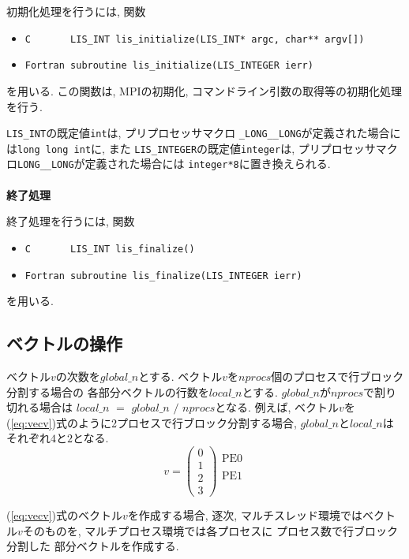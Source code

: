 \documentclass[a4paper]{jarticle}
\begin{document}
{{初期化処理を行うには, 関数
\begin{itemize}
\item \verb+C       LIS_INT lis_initialize(LIS_INT* argc, char** argv[])+
\item \verb+Fortran subroutine lis_initialize(LIS_INTEGER ierr)+
\end{itemize}
を用いる. 
この関数は, MPIの初期化, コマンドライン引数の取得等の初期化処理を行う. 

{\tt LIS\_INT}の既定値{\tt int}は, プリプロセッサマクロ
{\tt \_LONG\_\_LONG}が定義された場合には{\tt long long int}に, また
{\tt LIS\_INTEGER}の既定値{\tt integer}は, 
プリプロセッサマクロ{\tt LONG\_\_LONG}が定義された場合には
{\tt integer*8}に置き換えられる. 
\\ \\
\noindent
{\bf 終了処理}

終了処理を行うには, 関数
\begin{itemize}
\item \verb+C       LIS_INT lis_finalize()+
\item \verb+Fortran subroutine lis_finalize(LIS_INTEGER ierr)+
\end{itemize}
を用いる. 

\subsection{ベクトルの操作}
ベクトル$v$の次数を$global\_n$とする. 
ベクトル$v$を$nprocs$個のプロセスで行ブロック分割する場合の
各部分ベクトルの行数を$local\_n$とする. 
$global\_n$が$nprocs$で割り切れる場合は
$local\_n$ $=$ $global\_n$ $/$ $nprocs$となる. 
例えば, 
ベクトル$v$を(\ref{eq:vecv})式のように2プロセスで行ブロック分割する場合, 
$global\_n$と$local\_n$はそれぞれ$4$と$2$となる. 
\begin{equation}
v = 
\left(
\begin{array}{c}
0 \\
1 \\ \hline
2 \\
3  
\end{array}
\right)
\begin{array}{l}
\mbox{PE0} \\
    \\
\mbox{PE1} \\
   \\ 
\end{array}
\label{eq:vecv}
\end{equation}

(\ref{eq:vecv})式のベクトル$v$を作成する場合, 
逐次, マルチスレッド環境ではベクトル$v$そのものを, マルチプロセス環境では各プロセスに
プロセス数で行ブロック分割した
部分ベクトルを作成する. 

}}
\end{document}
